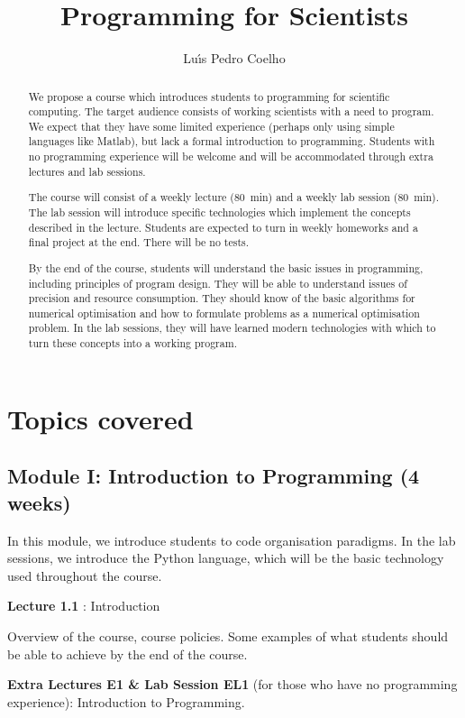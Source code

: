 \documentclass{article}
\title{Programming for Scientists}
\author{Lu\'\i s Pedro Coelho}
\newcommand*{\Lecture}[1]{%
{\bf #1}%
}
\begin{document}
\maketitle

\begin{abstract}
We propose a course which introduces students to programming for scientific computing. The target audience consists of working scientists with a need to program. We expect that they have some limited experience (perhaps only using simple languages like Matlab), but lack a formal introduction to programming. Students with no programming experience will be welcome and will be accommodated through extra lectures and lab sessions.

The course will consist of a weekly lecture (80~min) and a weekly lab session (80~min). The lab session will introduce specific technologies which implement the concepts described in the lecture. Students are expected to turn in weekly homeworks and a final project at the end. There will be no tests.

By the end of the course, students will understand the basic issues in programming, including principles of program design. They will be able to understand issues of precision and resource consumption. They should know of the basic algorithms for numerical optimisation and how to formulate problems as a numerical optimisation problem. In the lab sessions, they will have learned modern technologies with which to turn these concepts into a working program.
\end{abstract}

\section{Topics covered}

\subsection{Module I: Introduction to Programming (4 weeks)}

In this module, we introduce students to code organisation paradigms. In the lab sessions, we introduce the Python language, which will be the basic technology used throughout the course.

\Lecture{Lecture 1.1}: Introduction

Overview of the course, course policies. Some examples of what students should be able to achieve by the end of the course.

\Lecture{Extra Lectures E1 \& Lab Session EL1} (for those who have no programming experience): Introduction to Programming.
\end{document}
